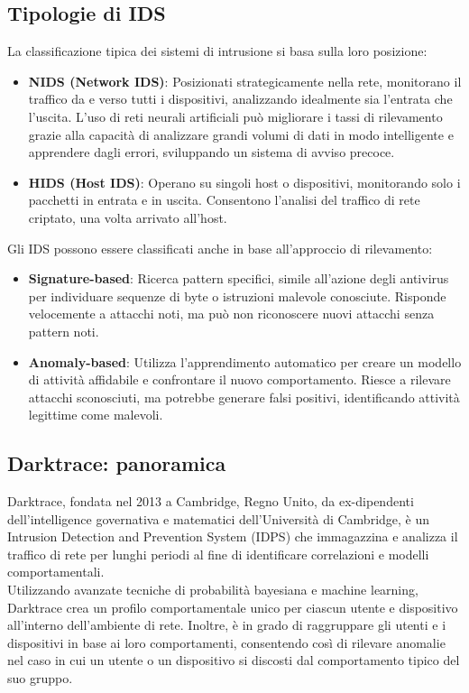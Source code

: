 \documentclass[12pt,a4paper,oneside,onecolumn,openright]{book}
\begin{document}
\subsection{Tipologie di IDS}
La classificazione tipica dei sistemi di intrusione si basa sulla loro posizione:
\begin{itemize}
	\item \textbf{NIDS (Network IDS)}: Posizionati strategicamente nella rete, 
	monitorano il traffico da e verso tutti i dispositivi, analizzando idealmente 
	sia l'entrata che l'uscita. L'uso di reti neurali artificiali può migliorare i 
	tassi di rilevamento grazie alla capacità di analizzare grandi volumi di dati 
	in modo intelligente e apprendere dagli errori, sviluppando un sistema di avviso precoce.
	\item \textbf{HIDS (Host IDS)}: Operano su singoli host o dispositivi, monitorando 
	solo i pacchetti in entrata e in uscita. Consentono l'analisi del traffico di rete 
	criptato, una volta arrivato all'host.
\end{itemize}
Gli IDS possono essere classificati anche in base all'approccio di rilevamento:
\begin{itemize}
	\item \textbf{Signature-based}: Ricerca pattern specifici, simile all'azione degli 
	antivirus per individuare sequenze di byte o istruzioni malevole conosciute. 
	Risponde velocemente a attacchi noti, ma può non riconoscere nuovi attacchi senza pattern noti.
	\item \textbf{Anomaly-based}: Utilizza l'apprendimento automatico per creare un 
	modello di attività affidabile e confrontare il nuovo comportamento. Riesce a 
	rilevare attacchi sconosciuti, ma potrebbe generare falsi positivi, identificando 
	attività legittime come malevoli.
\end{itemize}

\subsection{Darktrace: panoramica}
Darktrace, fondata nel 2013 a Cambridge, Regno Unito, da ex-dipendenti dell'intelligence 
governativa e matematici dell'Università di Cambridge, è un Intrusion Detection and 
Prevention System (IDPS) che immagazzina e analizza il traffico di rete per lunghi 
periodi al fine di identificare correlazioni e modelli comportamentali.\\

Utilizzando avanzate tecniche di probabilità bayesiana e machine learning, Darktrace 
crea un profilo comportamentale unico per ciascun utente e dispositivo all'interno 
dell'ambiente di rete. Inoltre, è in grado di raggruppare gli utenti e i dispositivi 
in base ai loro comportamenti, consentendo così di rilevare anomalie nel caso in cui 
un utente o un dispositivo si discosti dal comportamento tipico del suo gruppo.\\
\end{document}
